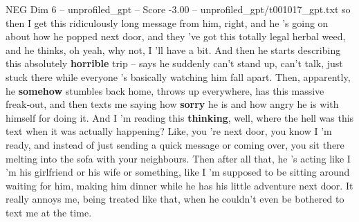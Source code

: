 \begin{textsample}{NEG Dim 6 – unprofiled\_gpt – Score -3.00 – unprofiled\_gpt/t001017\_gpt.txt}  \label{ex:f6_neg_027}
so then I get this ridiculously long message from him, right, and he ’s going on about how he popped next door, and they ’ve got this totally legal herbal weed, and he thinks, oh yeah, why not, I ’ll have a bit.
And then he starts describing this absolutely \textbf{horrible} trip – says he suddenly can't stand up, can't talk, just stuck there while everyone ’s basically watching him fall apart.
Then, apparently, he \textbf{somehow} stumbles back home, throws up everywhere, has this massive freak‑out, and then texts me saying how \textbf{sorry} he is and how angry he is with himself for doing it.
And I ’m reading this \textbf{thinking}, well, where the hell was this text when it was actually happening?
Like, you ’re next door, you know I ’m ready, and instead of just sending a quick message or coming over, you sit there melting into the sofa with your neighbours.
Then after all that, he ’s acting like I ’m his girlfriend or his wife or something, like I ’m supposed to be sitting around waiting for him, making him dinner while he has his little adventure next door.
It really annoys me, being treated like that, when he couldn't even be bothered to text me at the time.

\end{textsample}
